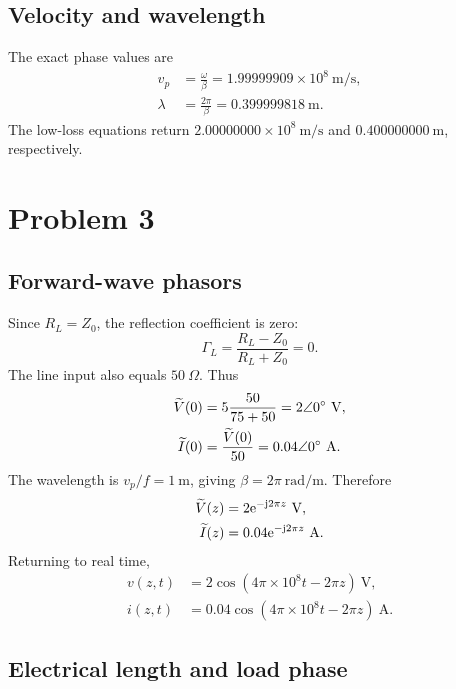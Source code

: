 \documentclass[12pt,a4paper]{article}
\begin{document}
\subsection{Velocity and wavelength}

The exact phase values are
\begin{align}
v_p&=\frac{\omega}{\beta}=1.99999909\times10^8~\mathrm{m/s},\\
\lambda&=\frac{2\pi}{\beta}=0.399999818~\mathrm{m}.
\end{align}
The low-loss equations return $2.00000000\times10^8~\mathrm{m/s}$ and
$0.400000000~\mathrm{m}$, respectively.


\section{Problem 3}


\subsection{Forward-wave phasors}

Since $R_L=Z_0$, the reflection coefficient is zero:
\[
\Gamma_L=\frac{R_L-Z_0}{R_L+Z_0}=0.
\]
The line input also equals $50~\Omega$.  Thus
\begin{align*}
\widetilde{V}(0)&=5\frac{50}{75+50}=2\angle0^{\circ}~\mathrm{V},\\
\widetilde{I}(0)&=\frac{\widetilde{V}(0)}{50}=0.04\angle0^{\circ}~\mathrm{A}.
\end{align*}
The wavelength is $v_p/f=1~\mathrm{m}$, giving $\beta=2\pi~\mathrm{rad/m}$.
Therefore
\begin{align}
\widetilde{V}(z)&=2\mathrm{e}^{-\mathrm{j}2\pi z}~\mathrm{V},\\
\widetilde{I}(z)&=0.04\mathrm{e}^{-\mathrm{j}2\pi z}~\mathrm{A}.
\end{align}
Returning to real time,
\begin{align}
v(z,t)&=2\cos(4\pi\times10^8t-2\pi z)~\mathrm{V},\\
i(z,t)&=0.04\cos(4\pi\times10^8t-2\pi z)~\mathrm{A}.
\end{align}

\subsection{Electrical length and load phase}
\end{document}

